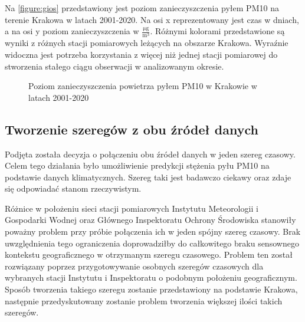 \documentclass[10pt,a4paper]{article}
\begin{document}
Na \autoref{figure:gios} przedstawiony jest poziom zanieczyszczenia pyłem PM10 na terenie Krakowa w latach 2001-2020. Na osi x reprezentowany jest czas w dniach, a na osi y poziom zanieczyszczenia w $\frac{\si{\micro\gram}}{\si\meter^3}$. Różnymi kolorami przedstawione są wyniki z różnych stacji pomiarowych leżących na obszarze Krakowa. Wyraźnie widoczna jest potrzeba korzystania z więcej niż jednej stacji pomiarowej do stworzenia stałego ciągu obserwacji w analizowanym okresie. 
\begin{figure}[!ht]
	\centering
	\caption{Poziom zanieczyszczenia powietrza pyłem PM10 w Krakowie w latach 2001-2020}
	\label{figure:gios}
\end{figure}
\FloatBarrier

\subsection{Tworzenie szeregów z obu źródeł danych}
Podjęta została decyzja o połączeniu obu źródeł danych w jeden szereg czasowy. Celem tego działania było umożliwienie predykcji stężenia pyłu PM10 na podstawie danych klimatycznych. Szereg taki jest badawczo ciekawy oraz zdaje się odpowiadać stanom rzeczywistym.

Różnice w położeniu sieci stacji pomiarowych Instytutu Meteorologii i Gospodarki Wodnej oraz Głównego Inspektoratu Ochrony Środowiska stanowiły poważny problem przy próbie połączenia ich w jeden spójny szereg czasowy. Brak uwzględnienia tego ograniczenia doprowadziłby do całkowitego braku sensownego kontekstu geograficznego w otrzymanym szeregu czasowego. Problem ten został rozwiązany poprzez przygotowywanie osobnych szeregów czasowych dla wybranych stacji Instytutu i Inspektoratu o podobnym położeniu geograficznym. Sposób tworzenia takiego szeregu zostanie przedstawiony na podstawie Krakowa, następnie przedyskutowany zostanie problem tworzenia większej ilości takich szeregów. 
\end{document}
